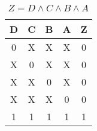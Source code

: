 
\begin{center}
    \begin{table}[h] \caption{\(Z = D \land C \land B \land A \)}
        \begin{center}
            \begin{tabular}{|c|c|c|c||c|} \hline
            D & C & B & A & Z \\ \hline\hline
            0 & X & X & X & 0 \\ \hline
            X & 0 & X & X & 0 \\ \hline
            X & X & 0 & X & 0 \\ \hline
            X & X & X & 0 & 0 \\ \hline
            1 & 1 & 1 & 1 & 1 \\ \hline
            \end{tabular}
        \end{center}
    \end{table}
\end{center}
